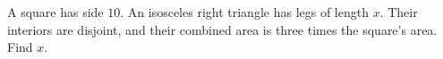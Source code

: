 A square has side $10$. An isosceles right triangle has legs of length $x$. Their interiors are disjoint, and their combined area is three times the square's area. Find $x$.
